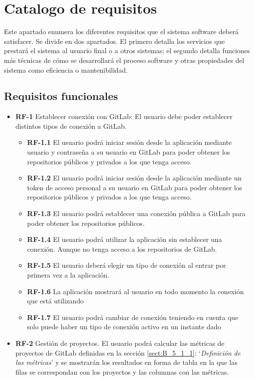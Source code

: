 \section{Catalogo de requisitos}
Este apartado enumera los diferentes requisitos que el sistema software deberá satisfacer. Se divide en dos apartados. El primero detalla los servicios que prestará el sistema al usuario final o a otros sistemas; el segundo detalla funciones más técnicas de cómo se desarrollará el proceso software y otras propiedades del sistema como eficiencia o mantenibilidad.

\subsection{Requisitos funcionales}

\begin{itemize}
	\item \textbf{RF-1} Establecer conexión con GitLab: El usuario debe poder establecer distintos tipos de conexión a GitLab.
	\begin{itemize}
		\item \textbf{RF-1.1} El usuario podrá iniciar sesión desde la aplicación mediante usuario y contraseña a su usuario en GitLab para poder obtener los repositorios públicos y privados a los que tenga acceso.
		\item \textbf{RF-1.2} El usuario podrá iniciar sesión desde la aplicación mediante un token de acceso personal a su usuario en GitLab para poder obtener los repositorios públicos y privados a los que tenga acceso.
		\item \textbf{RF-1.3} El usuario podrá establecer una conexión pública a GitLab para poder obtener los repositorios públicos.
		\item \textbf{RF-1.4} El usuario podrá utilizar la aplicación sin establecer una conexión. Aunque no tenga acceso a los repositorios de GitLab.
		\item \textbf{RF-1.5} El usuario deberá elegir un tipo de conexión al entrar por primera vez a la aplicación.
		\item \textbf{RF-1.6} La aplicación mostrará al usuario en todo momento la conexión que está utilizando
		\item \textbf{RF-1.7} El usuario podrá cambiar de conexión teniendo en cuenta que solo puede haber un tipo de conexión activo en un instante dado
	\end{itemize}
	\item \textbf{RF-2} Gestión de proyectos. El usuario podrá calcular las métricas de proyectos de GitLab definidas en la sección \ref{sect:B_5_1_1}: `\textit{Definición de las métricas}' y se mostrarán los resultados en forma de tabla en la que las filas se correspondan con los proyectos y las columnas con las métricas.

\end{itemize}
